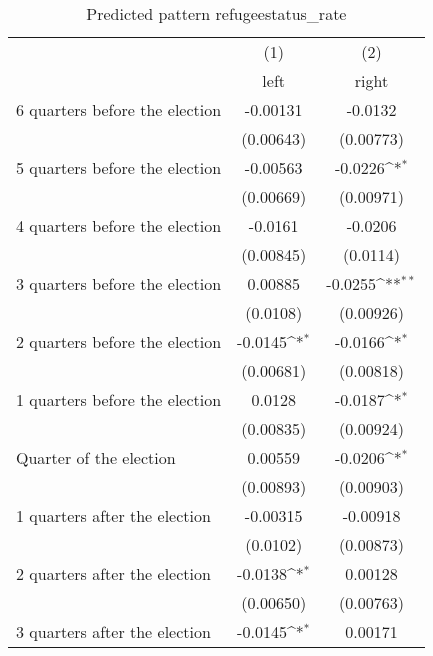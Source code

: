\begin{table}[htbp]\centering
\def\sym#1{\ifmmode^{#1}\else\(^{#1}\)\fi}
\caption{Predicted pattern refugeestatus\_rate}
\begin{tabular}{l*{2}{c}}
\hline\hline
                    &\multicolumn{1}{c}{(1)}&\multicolumn{1}{c}{(2)}\\
                    &\multicolumn{1}{c}{left}&\multicolumn{1}{c}{right}\\
\hline
 6 quarters before the election&    -0.00131         &     -0.0132         \\
                    &   (0.00643)         &   (0.00773)         \\
[1em]
 5 quarters before the election&    -0.00563         &     -0.0226\sym{*}  \\
                    &   (0.00669)         &   (0.00971)         \\
[1em]
 4 quarters before the election&     -0.0161         &     -0.0206         \\
                    &   (0.00845)         &    (0.0114)         \\
[1em]
 3 quarters before the election&     0.00885         &     -0.0255\sym{**} \\
                    &    (0.0108)         &   (0.00926)         \\
[1em]
 2 quarters before the election&     -0.0145\sym{*}  &     -0.0166\sym{*}  \\
                    &   (0.00681)         &   (0.00818)         \\
[1em]
 1 quarters before the election&      0.0128         &     -0.0187\sym{*}  \\
                    &   (0.00835)         &   (0.00924)         \\
[1em]
Quarter of the election&     0.00559         &     -0.0206\sym{*}  \\
                    &   (0.00893)         &   (0.00903)         \\
[1em]
 1 quarters after the election&    -0.00315         &    -0.00918         \\
                    &    (0.0102)         &   (0.00873)         \\
[1em]
 2 quarters after the election&     -0.0138\sym{*}  &     0.00128         \\
                    &   (0.00650)         &   (0.00763)         \\
[1em]
 3 quarters after the election&     -0.0145\sym{*}  &     0.00171         \\

\end{tabular}
\end{table}
